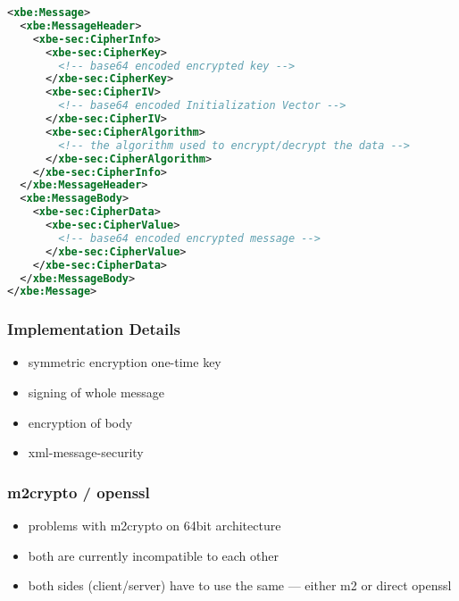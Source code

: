 \medskip
\begin{center}
  \begin{minipage}{.75\textwidth}
    \begin{lstlisting}[captionpos=b,backgroundcolor=\color{listingcolor},frame=lines,numbers=none,stepnumber=5,numberfirstline=false,numberstyle=\tiny,caption={The
        skeleton of an encrypted message.},label={lst:encrypted-message-skeleton},language=XML]
<xbe:Message>
  <xbe:MessageHeader>
    <xbe-sec:CipherInfo>
      <xbe-sec:CipherKey>
        <!-- base64 encoded encrypted key -->
      </xbe-sec:CipherKey>
      <xbe-sec:CipherIV>
        <!-- base64 encoded Initialization Vector -->
      </xbe-sec:CipherIV>
      <xbe-sec:CipherAlgorithm>
        <!-- the algorithm used to encrypt/decrypt the data -->
      </xbe-sec:CipherAlgorithm>
    </xbe-sec:CipherInfo>
  </xbe:MessageHeader>
  <xbe:MessageBody>
    <xbe-sec:CipherData>
      <xbe-sec:CipherValue>
        <!-- base64 encoded encrypted message -->
      </xbe-sec:CipherValue>
    </xbe-sec:CipherData>
  </xbe:MessageBody>
</xbe:Message>
    \end{lstlisting}
  \end{minipage}
\end{center}


\subsubsection{Implementation Details}


\begin{itemize}
\item symmetric encryption one-time key
\item signing of whole message
\item encryption of body
\item xml-message-security
\end{itemize}
\subsubsection{m2crypto / openssl}

\begin{itemize}
\item problems with m2crypto on 64bit architecture
\item both are currently incompatible to each other
\item both sides (client/server) have to use the same --- either m2 or
  direct openssl
\end{itemize}


